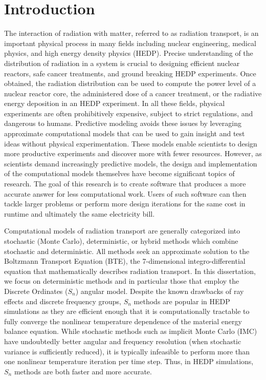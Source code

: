\documentclass[../doc.tex]{subfiles}
\begin{document}
\chapter{Introduction}
The interaction of radiation with matter, referred to as radiation transport, is an important physical process in many fields including nuclear engineering, medical physics, and high energy density physics (HEDP). Precise understanding of the distribution of radiation in a system is crucial to designing efficient nuclear reactors, safe cancer treatments, and ground breaking HEDP experiments. Once obtained, the radiation distribution can be used to compute the power level of a nuclear reactor core, the administered dose of a cancer treatment, or the radiative energy deposition in an HEDP experiment. In all these fields, physical experiments are often prohibitively expensive, subject to strict regulations, and dangerous to humans. Predictive modeling avoids these issues by leveraging approximate computational models that can be used to gain insight and test ideas without physical experimentation. These models enable scientists to design more productive experiments and discover more with fewer resources. However, as scientists demand increasingly predictive models, the design and implementation of the computational models themselves have become significant topics of research. The goal of this research is to create software that produces a more accurate answer for less computational work. Users of such software can then tackle larger problems or perform more design iterations for the same cost in runtime and ultimately the same electricity bill. 

Computational models of radiation transport are generally categorized into stochastic (Monte Carlo), deterministic, or hybrid methods which combine stochastic and deterministic. All methods seek an approximate solution to the Boltzmann Transport Equation (BTE), the 7-dimensional integro-differential equation that mathematically describes radiation transport. In this dissertation, we focus on deterministic methods and in particular those that employ the Discrete Ordinates ($S_n$) angular model. Despite the known drawbacks of ray effects and discrete frequency groups, $S_n$ methods are popular in HEDP simulations as they are efficient enough that it is computationally tractable to fully converge the nonlinear temperature dependence of the material energy balance equation. While stochastic methods such as implicit Monte Carlo (IMC) have undoubtedly better angular and frequency resolution (when stochastic variance is sufficiently reduced), it is typically infeasible to perform more than one nonlinear temperature iteration per time step. Thus, in HEDP simulations, $S_n$ methods are both faster and more accurate. 
\end{document}
